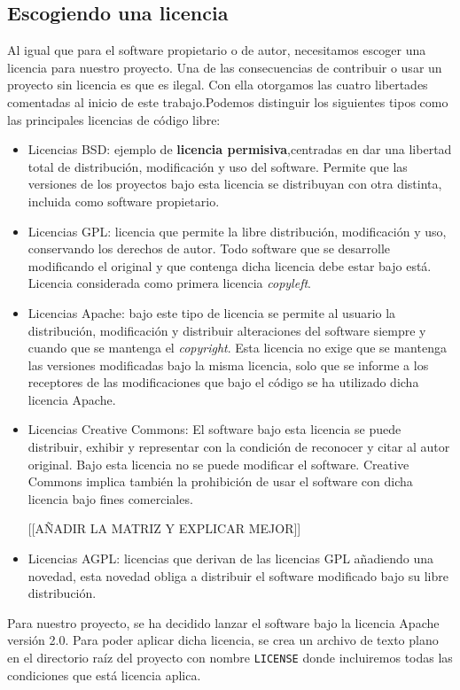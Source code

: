 \subsection*{Escogiendo una licencia}
Al igual que para el software propietario o de autor, necesitamos escoger una licencia para nuestro proyecto. Una de las consecuencias de contribuir o usar un proyecto sin licencia es que es ilegal. Con ella otorgamos las cuatro libertades comentadas al inicio de este trabajo.Podemos distinguir los siguientes tipos como las principales licencias de código libre:
\begin{itemize}
    \item Licencias BSD: ejemplo de \textbf{licencia permisiva},centradas en dar una libertad total de distribución, modificación y uso del software. Permite que las versiones de los proyectos bajo esta licencia se distribuyan con otra distinta, incluida como software propietario.
    \item Licencias GPL: licencia que permite la libre distribución, modificación y uso, conservando los derechos de autor. Todo software que se desarrolle modificando el original y que contenga dicha licencia debe estar bajo está. Licencia considerada como primera licencia \textit{copyleft}.
    \item Licencias Apache: bajo este tipo de licencia se permite al usuario la distribución, modificación y distribuir alteraciones del software siempre y cuando que se mantenga el \emph{copyright}. Esta licencia no exige que se mantenga las versiones modificadas bajo la misma licencia, solo que se informe a los receptores de las modificaciones que bajo el código se ha utilizado dicha licencia Apache.
    \item Licencias Creative Commons: El software bajo esta licencia se puede distribuir, exhibir y representar con la condición de reconocer y citar al autor original. Bajo esta licencia no se puede modificar el software. Creative Commons implica también la prohibición de usar el software con dicha licencia bajo fines comerciales. 
    
    [[AÑADIR LA MATRIZ Y EXPLICAR MEJOR]]
    \item Licencias AGPL: licencias que derivan de las licencias GPL añadiendo una novedad, esta novedad obliga a distribuir el software modificado bajo su libre distribución.
\end{itemize}

Para nuestro proyecto, se ha decidido lanzar el software bajo la licencia Apache versión 2.0. Para poder aplicar dicha licencia, se crea un archivo de texto plano en el directorio raíz del proyecto con nombre \texttt{LICENSE} donde incluiremos todas las condiciones que está licencia aplica. 


